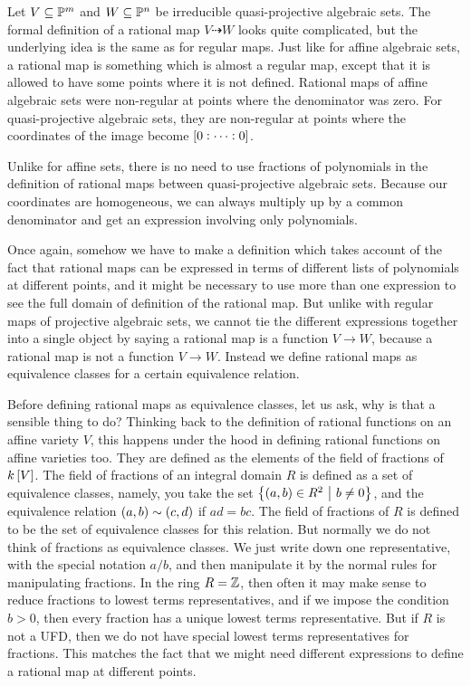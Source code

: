 Let $ V \subseteq \mathbb{P}^m $ and $ W \subseteq \mathbb{P}^n $ be irreducible quasi-projective algebraic sets. The formal definition of a rational map $ V \dashrightarrow W $ looks quite complicated, but the underlying idea is the same as for regular maps. Just like for affine algebraic sets, a rational map is something which is almost a regular map, except that it is allowed to have some points where it is not defined. Rational maps of affine algebraic sets were non-regular at points where the denominator was zero. For quasi-projective algebraic sets, they are non-regular at points where the coordinates of the image become $ \sbr{0 : \dots : 0} $.

\begin{note*}
Unlike for affine sets, there is no need to use fractions of polynomials in the definition of rational maps between quasi-projective algebraic sets. Because our coordinates are homogeneous, we can always multiply up by a common denominator and get an expression involving only polynomials.
\end{note*}

Once again, somehow we have to make a definition which takes account of the fact that rational maps can be expressed in terms of different lists of polynomials at different points, and it might be necessary to use more than one expression to see the full domain of definition of the rational map. But unlike with regular maps of projective algebraic sets, we cannot tie the different expressions together into a single object by saying a rational map is a function $ V \to W $, because a rational map is not a function $ V \to W $. Instead we define rational maps as equivalence classes for a certain equivalence relation.

\pagebreak

\begin{note*}
Before defining rational maps as equivalence classes, let us ask, why is that a sensible thing to do? Thinking back to the definition of rational functions on an affine variety $ V $, this happens under the hood in defining rational functions on affine varieties too. They are defined as the elements of the field of fractions of $ k\sbr{V} $. The field of fractions of an integral domain $ R $ is defined as a set of equivalence classes, namely, you take the set $ \cbr{\br{a, b} \in R^2 \st b \ne 0} $, and the equivalence relation $ \br{a, b} \sim \br{c, d} $ if $ ad = bc $. The field of fractions of $ R $ is defined to be the set of equivalence classes for this relation. But normally we do not think of fractions as equivalence classes. We just write down one representative, with the special notation $ a / b $, and then manipulate it by the normal rules for manipulating fractions. In the ring $ R = \mathbb{Z} $, then often it may make sense to reduce fractions to lowest terms representatives, and if we impose the condition $ b > 0 $, then every fraction has a unique lowest terms representative. But if $ R $ is not a UFD, then we do not have special lowest terms representatives for fractions. This matches the fact that we might need different expressions to define a rational map at different points.
\end{note*}

